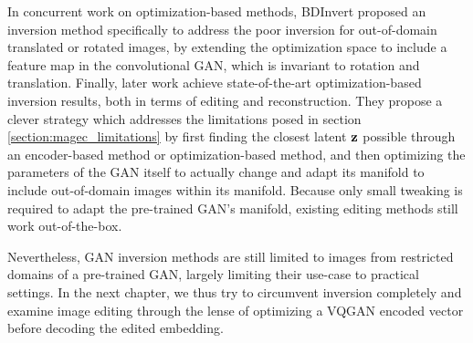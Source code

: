 In  concurrent work on optimization-based methods, 
BDInvert \citep{kang2021gan} proposed an inversion method specifically to address the 
poor inversion for out-of-domain translated or rotated images, by extending the 
optimization space to include a feature map in the convolutional \ac{GAN}, which is invariant
to rotation and translation. Finally, later work \citep{feng2022near} achieve 
state-of-the-art optimization-based inversion results, both in terms of editing and reconstruction.
They propose a clever strategy which addresses the limitations posed in section \ref{section:magec_limitations}
by first finding the closest latent $\mathbf{z}$ possible through an encoder-based method 
or optimization-based method, and then optimizing the parameters of the \ac{GAN}
itself to actually change and adapt its manifold to include out-of-domain images 
within its manifold. Because only small tweaking is required to adapt the pre-trained 
\ac{GAN}'s manifold, existing editing methods still work out-of-the-box.

Nevertheless, \ac{GAN} inversion methods are still limited to images from restricted 
domains of a pre-trained \ac{GAN}, largely limiting their use-case to practical settings. 
In the next chapter, we thus try to circumvent inversion completely and examine image 
editing through the lense of optimizing a VQGAN \citep{esser2021taming} encoded vector 
before decoding the edited embedding. 

